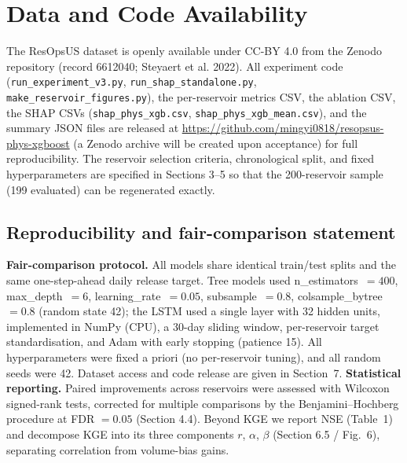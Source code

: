 \documentclass[journal]{ascelike-new}
\begin{document}
\section{Data and Code Availability}


The ResOpsUS dataset is openly available under CC-BY 4.0 from the Zenodo repository (record 6612040; Steyaert et al. 2022). All experiment code (\texttt{run\_experiment\_v3.py}, \texttt{run\_shap\_standalone.py}, \texttt{make\_reservoir\_figures.py}), the per-reservoir metrics CSV, the ablation CSV, the SHAP CSVs (\texttt{shap\_phys\_xgb.csv}, \texttt{shap\_phys\_xgb\_mean.csv}), and the summary JSON files are released at \url{https://github.com/mingyi0818/resopsus-phys-xgboost} (a Zenodo archive will be created upon acceptance) for full reproducibility. The reservoir selection criteria, chronological split, and fixed hyperparameters are specified in Sections 3--5 so that the 200-reservoir sample (199 evaluated) can be regenerated exactly.






\subsection*{Reproducibility and fair-comparison statement}\label{sec:repro}
\textbf{Fair-comparison protocol.} All models share identical train/test splits and the same one-step-ahead daily release target. Tree models used n\_estimators~$=400$, max\_depth~$=6$, learning\_rate~$=0.05$, subsample~$=0.8$, colsample\_bytree~$=0.8$ (random state 42); the LSTM used a single layer with 32 hidden units, implemented in NumPy (CPU), a 30-day sliding window, per-reservoir target standardisation, and Adam with early stopping (patience 15). All hyperparameters were fixed a priori (no per-reservoir tuning), and all random seeds were 42. Dataset access and code release are given in Section~7.
\textbf{Statistical reporting.} Paired improvements across reservoirs were assessed with Wilcoxon signed-rank tests, corrected for multiple comparisons by the Benjamini--Hochberg procedure at FDR $=0.05$ (Section 4.4). Beyond KGE we report NSE (Table~1) and decompose KGE into its three components $r$, $\alpha$, $\beta$ (Section 6.5 / Fig.~6), separating correlation from volume-bias gains.

\end{document}
